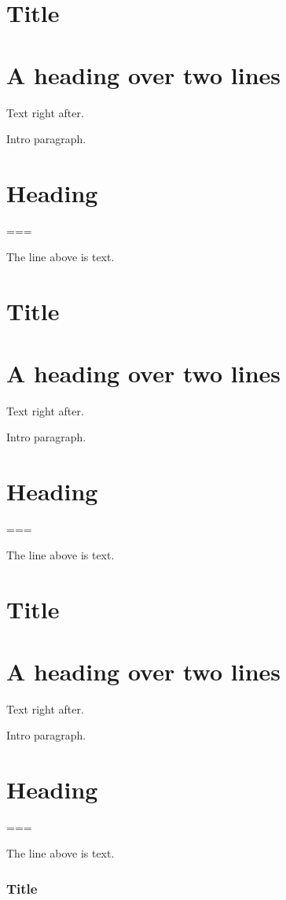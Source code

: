 \section{Title}
\section{A heading over
two lines}
Text right after.

Intro paragraph.

\section{Heading}

===

The line above is text.
\section{Title}
\section{A heading over
two lines}
Text right after.

Intro paragraph.

\section{Heading}

===

The line above is text.
\section{Title}
\section{A heading over
two lines}
Text right after.

Intro paragraph.

\section{Heading}

===

The line above is text.
\begin{frame}[t]
\frametitle{Title}

\end{frame}

